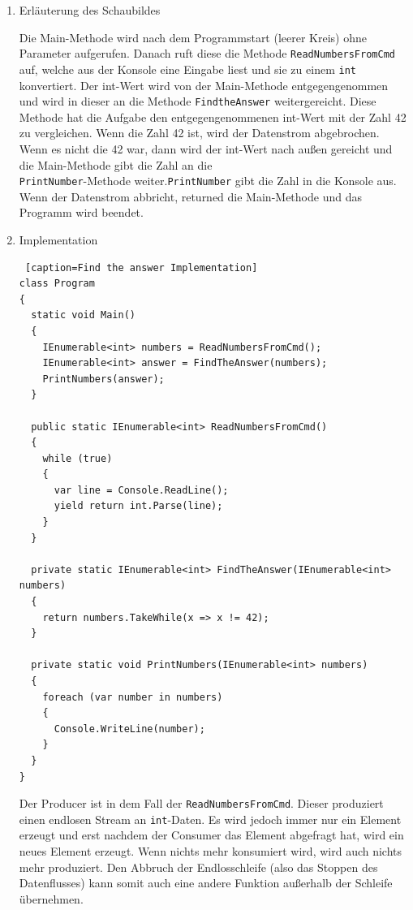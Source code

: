 \begin{enumerate}
\item Erläuterung des Schaubildes

Die  Main-Methode wird nach dem Programmstart (leerer Kreis) ohne Parameter aufgerufen.
Danach ruft diese die Methode \texttt{ReadNumbersFromCmd} auf, welche aus der Konsole eine Eingabe liest und sie
zu einem  \texttt{int} konvertiert. Der int-Wert wird von der Main-Methode entgegengenommen und wird in dieser an die Methode \texttt{FindtheAnswer} weitergereicht.
Diese Methode hat die Aufgabe den entgegengenommenen int-Wert mit der Zahl 42 zu vergleichen. Wenn die Zahl 42 ist, wird der Datenstrom
abgebrochen. Wenn es nicht die 42 war, dann wird der int-Wert nach außen gereicht und die Main-Methode gibt die Zahl an die
\\\texttt{PrintNumber}-Methode weiter.\texttt{PrintNumber} gibt die Zahl in die Konsole aus.
Wenn der Datenstrom abbricht, returned die Main-Methode und das Programm wird beendet.

\item Implementation


\begin{lstlisting} [caption=Find the answer Implementation]
class Program
{
  static void Main()
  {
    IEnumerable<int> numbers = ReadNumbersFromCmd();
    IEnumerable<int> answer = FindTheAnswer(numbers);
    PrintNumbers(answer);
  }

  public static IEnumerable<int> ReadNumbersFromCmd()
  {
    while (true)
    {
      var line = Console.ReadLine();
      yield return int.Parse(line);
    }
  }

  private static IEnumerable<int> FindTheAnswer(IEnumerable<int> numbers)
  {
    return numbers.TakeWhile(x => x != 42);
  }

  private static void PrintNumbers(IEnumerable<int> numbers)
  {
    foreach (var number in numbers)
    {
      Console.WriteLine(number);
    }
  }
}
\end{lstlisting}

Der Producer ist in dem Fall der \texttt{ReadNumbersFromCmd}.
Dieser produziert einen endlosen Stream an \texttt{int}-Daten.
Es wird jedoch immer nur ein Element erzeugt und erst nachdem der Consumer das
Element abgefragt hat, wird ein neues Element erzeugt.
Wenn nichts mehr konsumiert wird, wird auch nichts mehr produziert.
Den Abbruch der Endlosschleife (also das Stoppen des Datenflusses) kann somit auch eine andere Funktion außerhalb der Schleife
übernehmen.
\end{enumerate}




